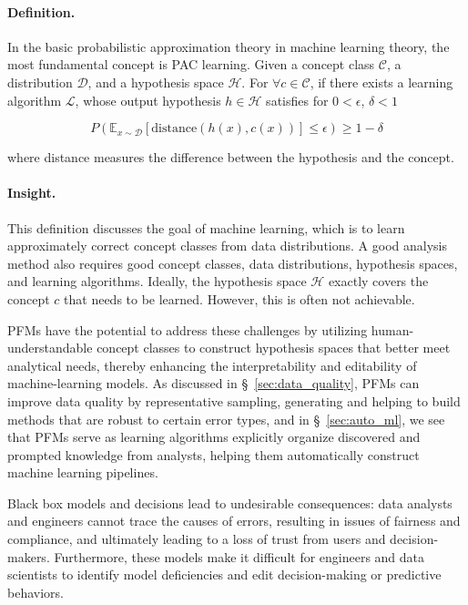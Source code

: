 \paragraph{Definition.} In the basic probabilistic approximation theory in machine learning theory, the most fundamental concept is PAC learning. Given a concept class $\mathcal{C}$, a distribution $\mathcal{D}$, and a hypothesis space $\mathcal{H}$. For $\forall c \in \mathcal{C}$, if there exists a learning algorithm $\mathcal{L}$, whose output hypothesis $h \in \mathcal{H}$ satisfies for $0<\epsilon$, $\delta < 1$ 

\begin{equation} P(\mathbb{E}_{x\sim \mathcal{D}}[\text{distance}(h(x), c(x))] \leq \epsilon) \geq 1-\delta \end{equation}

where distance measures the difference between the hypothesis and the concept.

\paragraph{Insight.} This definition discusses the goal of machine learning, which is to learn approximately correct concept classes from data distributions. A good analysis method also requires good concept classes, data distributions, hypothesis spaces, and learning algorithms. Ideally, the hypothesis space $\mathcal{H}$ exactly covers the concept $c$ that needs to be learned. However, this is often not achievable.


PFMs have the potential to address these challenges by utilizing human-understandable concept classes to construct hypothesis spaces that better meet analytical needs, thereby enhancing the interpretability and editability of machine-learning models. As discussed in \S~\ref{sec:data_quality}, PFMs can improve data quality by representative sampling, generating and helping to build methods that are robust to certain error types, and in \S~\ref{sec:auto_ml}, we see that PFMs serve as learning algorithms explicitly organize discovered and prompted knowledge from analysts, helping them automatically construct machine learning pipelines.

Black box models and decisions lead to undesirable consequences: data analysts and engineers cannot trace the causes of errors, resulting in issues of fairness and compliance, and ultimately leading to a loss of trust from users and decision-makers. Furthermore, these models make it difficult for engineers and data scientists to identify model deficiencies and edit decision-making or predictive behaviors.

